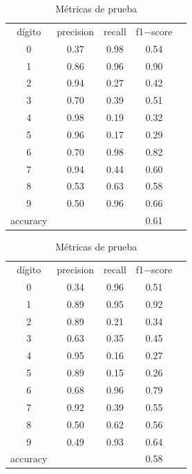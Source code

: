 \documentclass[paper=letter, fontsize=11pt]{scrartcl}
\numberwithin{equation}{section} %
\numberwithin{figure}{section} %
\numberwithin{table}{section} %
\begin{document}
\begin{table}[H]
    \centering 
    \caption{Métricas de los conjuntos de entrenamiento y prueba, usando QDA.} \label{metricas_dda}
\begin{minipage}{.5\linewidth}
        \caption{Métricas de entrenamiento}
        \centering
        \begin{tabular}{|c|c|c|c|c}
        \hline
dígito  & precision &  recall & f1$-$score\\
0       &    0.37  &  0.98   &  0.54\\  
1       &    0.86  &  0.96   &  0.90\\  
2       &    0.94  &  0.27   &  0.42\\  
3       &    0.70  &  0.39   &  0.51\\  
4       &    0.98  &  0.19   &  0.32\\  
5       &    0.96  &  0.17   &  0.29\\  
6       &    0.70  &  0.98   &  0.82\\  
7       &    0.94  &  0.44   &  0.60\\  
8       &    0.53  &  0.63   &  0.58\\  
9       &    0.50  &  0.96   &  0.66\\  \hline \hline
accuracy  & & & 0.61\\ \hline \hline
        \end{tabular}
    \end{minipage}%
    \begin{minipage}{.5\linewidth}
      \centering
        \caption{Métricas de prueba}
        \begin{tabular}{|c|c|c|c|c}
        \hline
dígito  & precision &  recall & f1$-$score\\
0       &    0.34  &  0.96   &  0.51\\  
1       &    0.89  &  0.95   &  0.92\\  
2       &    0.89  &  0.21   &  0.34\\  
3       &    0.63  &  0.35   &  0.45\\  
4       &    0.95  &  0.16   &  0.27\\  
5       &    0.89  &  0.15   &  0.26\\  
6       &    0.68  &  0.96   &  0.79\\  
7       &    0.92  &  0.39   &  0.55\\  
8       &    0.50  &  0.62   &  0.56\\  
9       &    0.49  &  0.93   &  0.64\\  \hline \hline
accuracy  & & & 0.58\\ \hline \hline
        \end{tabular}
    \end{minipage} 
\end{table}
\end{document}
